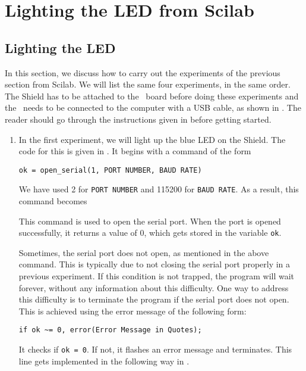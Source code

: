 \section{Lighting the LED from Scilab}
\subsection{Lighting the LED}
\label{sec:light-sci}
In this section, we discuss how to carry out the experiments of the
previous section from Scilab.  We will list the same four experiments,
in the same order.  The Shield has to be attached to the \arduino\ board
before doing these experiments and the \arduino\ needs to be connected to the computer 
with a USB cable, as shown in .
The reader should go through the instructions given in
 before getting started. 
\begin{enumerate}
  \item In the first experiment, we will light up the blue LED on the
        Shield.  The code for this is given in .  It
        begins with a command of the form
        \begin{lstlisting}[style=nonumbers]
     ok = open_serial(1, PORT NUMBER, BAUD RATE)
  \end{lstlisting}
        We have used 2 for {\tt PORT NUMBER} and 115200 for {\tt BAUD RATE}.
        As a result, this command becomes
        
        This command is used to open the serial port.  When the port is
        opened successfully, it returns a value of 0, which gets stored in
        the variable {\tt ok}.
        
        Sometimes, the serial port does not open, as mentioned in the above
        command.  This is typically due to not closing the serial port
        properly in a previous experiment.  If this condition is not
        trapped, the program will wait forever, without any information
        about this difficulty.  One way to address this difficulty is to
        terminate the program if the serial port does not open.  This is
        achieved using the error message of the following form:
        \begin{lstlisting}[style=nonumbers]
     if ok ~= 0, error(Error Message in Quotes);
  \end{lstlisting}
        It checks if {\tt ok = 0}.  If not, it flashes an error message and
        terminates.  This line gets implemented in the following way in
        .  
        
        

\end{enumerate}
